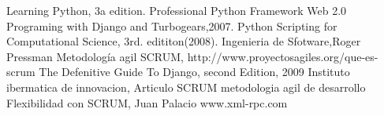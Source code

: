 \begin{thebibliography}{2007}
Learning Python, 3a edition.
Professional Python Framework Web 2.0 Programing with Django and Turbogears,2007.
Python Scripting for Computational Science, 3rd. edititon(2008). 
Ingenieria de Sfotware,Roger Pressman
Metodología agil SCRUM, http://www.proyectosagiles.org/que-es-scrum
The Defenitive Guide To Django, second Edition, 2009
 Instituto ibermatica de innovacion, Articulo SCRUM metodologia agil de desarrollo
 Flexibilidad con SCRUM, Juan Palacio
www.xml-rpc.com
\end{thebibliography}